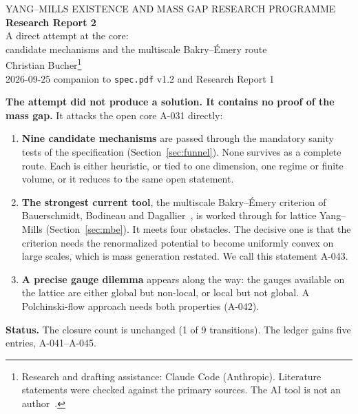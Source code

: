 \documentclass[11pt,a4paper]{article}
\newcommand{\idref}[1]{\textsf{#1}}
\begin{document}
\begin{center}
{\sffamily\small YANG--MILLS EXISTENCE AND MASS GAP \textperiodcentered{} RESEARCH PROGRAMME}\\[8pt]
{\LARGE\bfseries Research Report 2}\\[4pt]
{\Large A direct attempt at the core:\\candidate mechanisms and the multiscale Bakry--Émery route}\\[10pt]
{\large Christian Bucher}\footnote{Research and drafting assistance: Claude Code (Anthropic). Literature statements were checked against the primary sources. The AI tool is not an author~\cite{COPE23}.}\\[4pt]
{\small 2026-09-25 \textperiodcentered{} companion to \texttt{spec.pdf} v1.2 and Research Report 1}
\end{center}

\begin{keybox}[title=Result in brief]
\textbf{The attempt did not produce a solution. It contains no proof of the mass gap.} It attacks the open core \idref{A-031} directly:
\begin{enumerate}[leftmargin=1.4em]
\item \textbf{Nine candidate mechanisms} are passed through the mandatory sanity tests of the specification (Section~\ref{sec:funnel}). None survives as a complete route. Each is either heuristic, or tied to one dimension, one regime or finite volume, or it reduces to the same open statement.
\item \textbf{The strongest current tool}, the multiscale Bakry--Émery criterion of Bauerschmidt, Bodineau and Dagallier~\cite{BBD24}, is worked through for lattice Yang--Mills (Section~\ref{sec:mbe}). It meets four obstacles. The decisive one is that the criterion needs the renormalized potential to become uniformly convex on large scales, which is mass generation restated. We call this statement \idref{A-043}.
\item \textbf{A precise gauge dilemma} appears along the way: the gauges available on the lattice are either global but non-local, or local but not global. A Polchinski-flow approach needs both properties (\idref{A-042}).
\end{enumerate}
\textbf{Status.} The closure count is unchanged (1 of 9 transitions). The ledger gains five entries, \idref{A-041}--\idref{A-045}.
\end{keybox}

\end{document}

